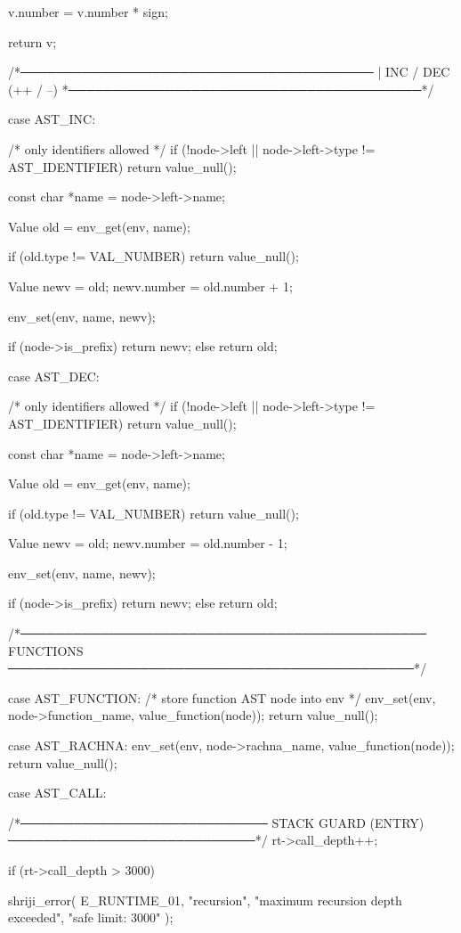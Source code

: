 \documentclass{article}
\begin{document}
{{{    v.number = v.number * sign;

    return v;
}

/*────────────────────────────────────────
 | INC / DEC (++ / --)
 *────────────────────────────────────────*/

case AST_INC: {

    /* only identifiers allowed */
    if (!node->left || node->left->type != AST_IDENTIFIER) {
        return value_null();
    }

    const char *name = node->left->name;

    Value old = env_get(env, name);

    if (old.type != VAL_NUMBER) {
        return value_null();
    }

    Value newv = old;
    newv.number = old.number + 1;

    env_set(env, name, newv);

    if (node->is_prefix)
        return newv;
    else
        return old;
}

case AST_DEC: {

    /* only identifiers allowed */
    if (!node->left || node->left->type != AST_IDENTIFIER) {
        return value_null();
    }

    const char *name = node->left->name;

    Value old = env_get(env, name);

    if (old.type != VAL_NUMBER) {
        return value_null();
    }

    Value newv = old;
    newv.number = old.number - 1;

    env_set(env, name, newv);

    if (node->is_prefix)
        return newv;
    else
        return old;
}

    /*──────────────────────────────────────────────
      FUNCTIONS
    ──────────────────────────────────────────────*/

    case AST_FUNCTION: {
        /* store function AST node into env */
        env_set(env, node->function_name, value_function(node));
        return value_null();
    }

case AST_RACHNA: {
    env_set(env, node->rachna_name, value_function(node));
    return value_null();
}

case AST_CALL: {

/*────────────────────────────
  STACK GUARD (ENTRY)
────────────────────────────*/
rt->call_depth++;

if (rt->call_depth > 3000) {
    shriji_error(
        E_RUNTIME_01,
        "recursion",
        "maximum recursion depth exceeded",
        "safe limit: 3000"
    );

}}}}
\end{document}
